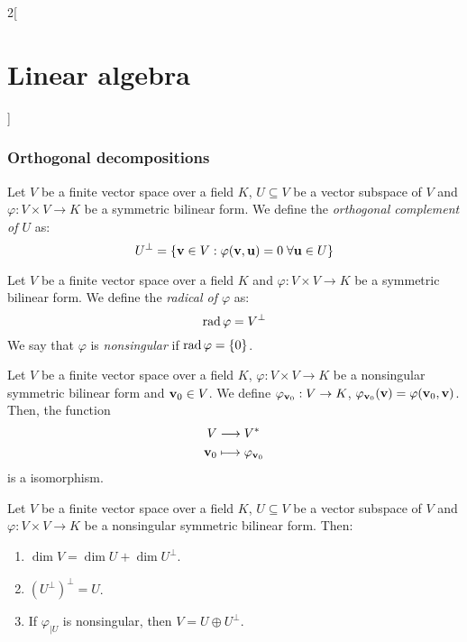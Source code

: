 \documentclass[../../../main.tex]{subfiles}
\begin{document}
\begin{multicols}{2}[\section{Linear algebra}]
    \subsubsection*{Orthogonal decompositions}
    \begin{definition}\label{ALG-singular}
        Let $V$ be a finite vector space over a field $K$, $U\subseteq V$ be a vector subspace of $V$ and $\varphi:V\times V\rightarrow K$ be a symmetric bilinear form. We define the \textit{orthogonal complement of $U$} as: $$U^\perp=\{\boldsymbol{\mathrm{v}}\in V:\varphi(\boldsymbol{\mathrm{v}},\boldsymbol{\mathrm{u}})=0\;\forall\boldsymbol{\mathrm{u}}\in U\}$$
    \end{definition}
    \begin{definition}
        Let $V$ be a finite vector space over a field $K$ and $\varphi:V\times V\rightarrow K$ be a symmetric bilinear form. We define the \textit{radical of $\varphi$} as: $$\operatorname{rad}\varphi=V^\perp$$ We say that $\varphi$ is \textit{nonsingular} if $\operatorname{rad}\varphi=\{0\}$.
    \end{definition}
    \begin{definition}
        Let $V$ be a finite vector space over a field $K$, $\varphi:V\times V\rightarrow K$ be a nonsingular symmetric bilinear form and $\boldsymbol{\mathrm{v}}_0\in V$. We define $\varphi_{\boldsymbol{\mathrm{v}}_0}:V\rightarrow K$, $\varphi_{\boldsymbol{\mathrm{v}}_0}(\boldsymbol{\mathrm{v}})=\varphi(\boldsymbol{\mathrm{v}}_0,\boldsymbol{\mathrm{v}})$. Then, the function
        \begin{align*}
            V                    & \longrightarrow V^*                       \\
            \boldsymbol{\mathrm{v}}_0 & \longmapsto\varphi_{\boldsymbol{\mathrm{v}}_0}
        \end{align*} is a isomorphism.
    \end{definition}
    \begin{definition}
        Let $V$ be a finite vector space over a field $K$, $U\subseteq V$ be a vector subspace of $V$ and $\varphi:V\times V\rightarrow K$ be a nonsingular symmetric bilinear form. Then:
        \begin{enumerate}
            \item $\dim V=\dim U+\dim U^\perp$.
            \item ${(U^\perp)}^\perp=U$.
            \item If $\varphi_{|U}$ is nonsingular, then $V=U\oplus U^\perp$.
        \end{enumerate}
    \end{definition}

\end{multicols}
\end{document}
